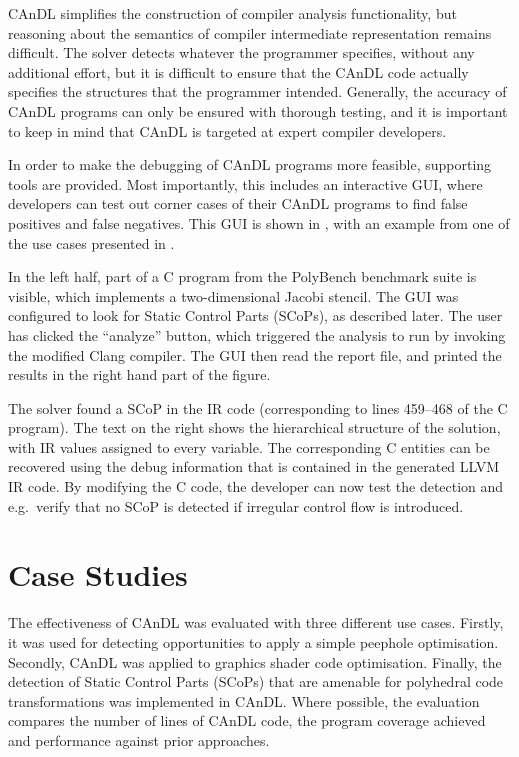     CAnDL simplifies the construction of compiler analysis functionality, but
    reasoning about the semantics of compiler intermediate representation
    remains difficult.
    The solver detects whatever the programmer specifies, without any additional
    effort, but it is difficult to ensure that the CAnDL code actually
    specifies the structures that the programmer intended.
    Generally, the accuracy of CAnDL programs can only be ensured with
    thorough testing, and it is important to keep in mind that CAnDL is targeted
    at expert compiler developers.

    In order to make the debugging of CAnDL programs more feasible, 
    supporting tools are provided.
    Most importantly, this includes an interactive GUI, where developers can
    test out corner cases of their CAnDL programs to find false positives and
    false negatives.
    This GUI is shown in , with an example from one of the use
    cases presented in .

    In the left half, part of a C program from the PolyBench benchmark suite
    is visible, which implements a two-dimensional Jacobi stencil.
    The GUI was configured to look for Static Control Parts (SCoPs), as
    described later.
    The user has clicked the ``analyze'' button, which triggered the analysis to
    run by invoking the modified Clang compiler.
    The GUI then read the report file, and printed the results in the right
    hand part of the figure.

    The solver found a SCoP in the IR code (corresponding to lines 459--468 of
    the C program).
    The text on the right shows the hierarchical structure of the solution, with
    IR values assigned to every variable.
    The corresponding C entities can be recovered using the debug
    information that is contained in the generated LLVM IR code.
    By modifying the C code, the developer can now test the detection and
    e.g.\ verify that no SCoP is detected if irregular control flow is
    introduced.

\section{Case Studies}
\label{sec:casestudies}

    The effectiveness of CAnDL was evaluated with three different use cases.
    Firstly, it was used for detecting opportunities to apply a simple peephole
    optimisation.
    Secondly, CAnDL was applied to graphics shader code optimisation.
    Finally, the detection of Static Control Parts (SCoPs) that are
    amenable for polyhedral code transformations was implemented in CAnDL.
    Where possible, the evaluation compares the number of lines of CAnDL code,
    the program coverage achieved and performance against prior approaches.

